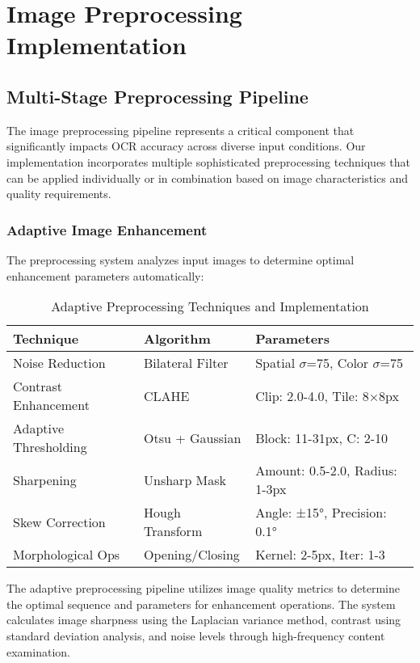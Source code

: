 \section{Image Preprocessing Implementation}

\subsection{Multi-Stage Preprocessing Pipeline}

The image preprocessing pipeline represents a critical component that significantly impacts OCR accuracy across diverse input conditions. Our implementation incorporates multiple sophisticated preprocessing techniques that can be applied individually or in combination based on image characteristics and quality requirements.

\subsubsection{Adaptive Image Enhancement}

The preprocessing system analyzes input images to determine optimal enhancement parameters automatically:

\begin{table}[H]
\centering
\caption{Adaptive Preprocessing Techniques and Implementation}
\label{tab:preprocessing_adaptive}
{\begin{tabular}{lll}
\toprule
\textbf{Technique} & \textbf{Algorithm} & \textbf{Parameters} \\
\midrule
Noise Reduction & Bilateral Filter & Spatial $\sigma$=75, Color $\sigma$=75 \\
Contrast Enhancement & CLAHE & Clip: 2.0-4.0, Tile: 8×8px \\
Adaptive Thresholding & Otsu + Gaussian & Block: 11-31px, C: 2-10 \\
Sharpening & Unsharp Mask & Amount: 0.5-2.0, Radius: 1-3px \\
Skew Correction & Hough Transform & Angle: ±15°, Precision: 0.1° \\
Morphological Ops & Opening/Closing & Kernel: 2-5px, Iter: 1-3 \\
\bottomrule
\end{tabular}}
\end{table}

The adaptive preprocessing pipeline utilizes image quality metrics to determine the optimal sequence and parameters for enhancement operations. The system calculates image sharpness using the Laplacian variance method, contrast using standard deviation analysis, and noise levels through high-frequency content examination.

